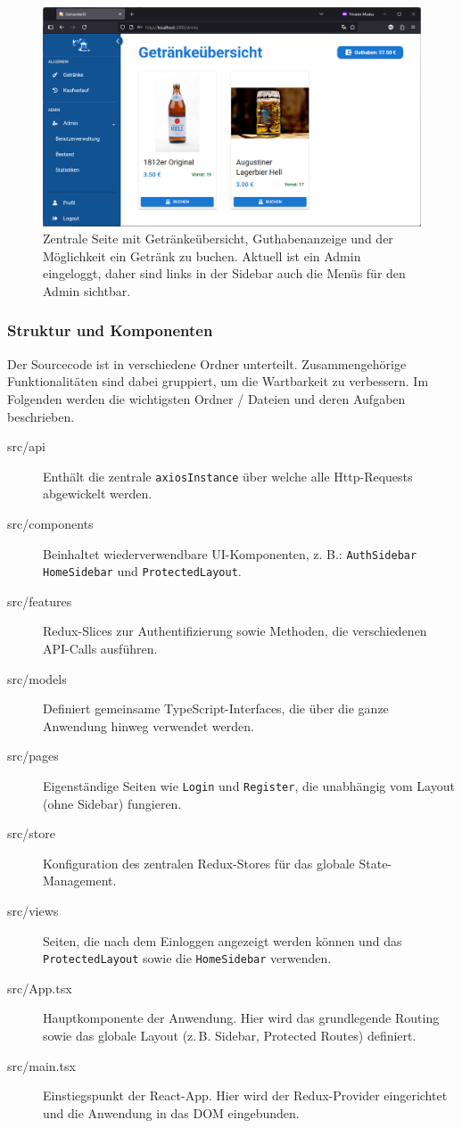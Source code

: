 \documentclass[conference,a4paper]{cs-techrep}
\begin{document}
\begin{figure}[h]
	\centering
	\includegraphics[width=1.0\linewidth]{Oberflaeche_Getraenkeuebersicht}
	\caption{Zentrale Seite mit Getränkeübersicht, Guthabenanzeige und der Möglichkeit ein Getränk zu buchen.
	Aktuell ist ein Admin eingeloggt, daher sind links in der Sidebar auch die Menüs für den Admin sichtbar.}
	\label{fig:oberflaechegetraenkeuebersicht}
\end{figure}


\subsubsection{Struktur und Komponenten}
Der Sourcecode ist in verschiedene Ordner unterteilt. Zusammengehörige Funktionalitäten sind dabei gruppiert, um die Wartbarkeit zu verbessern. Im Folgenden werden die wichtigsten Ordner / Dateien und deren Aufgaben beschrieben.

\begin{description}
	\item[src/api] Enthält die zentrale \texttt{axiosInstance} über welche alle Http-Requests abgewickelt werden.
	\item[src/components] Beinhaltet wiederverwendbare UI-Komponenten, z. B.: \texttt{AuthSidebar} \texttt{HomeSidebar} und \texttt{ProtectedLayout}.
	\item [src/features] Redux-Slices zur Authentifizierung sowie Methoden, die verschiedenen API-Calls ausführen.
	\item [src/models] Definiert gemeinsame TypeScript-Interfaces, die über die ganze Anwendung hinweg verwendet werden.
	\item [src/pages] Eigenständige Seiten wie \texttt{Login} und \texttt{Register}, die unabhängig vom Layout (ohne Sidebar) fungieren.
	\item[src/store] Konfiguration des zentralen Redux-Stores für das globale State-Management.
	\item[src/views] Seiten, die nach dem Einloggen angezeigt werden können und das \texttt{ProtectedLayout} sowie die \texttt{HomeSidebar} verwenden.
	\item[src/App.tsx] Hauptkomponente der Anwendung. Hier wird das grundlegende Routing sowie das globale Layout (z.\,B. Sidebar, Protected Routes) definiert.
	\item[src/main.tsx] Einstiegspunkt der React-App. Hier wird der Redux-Provider eingerichtet und die Anwendung in das DOM eingebunden.
\end{description}
\end{document}
